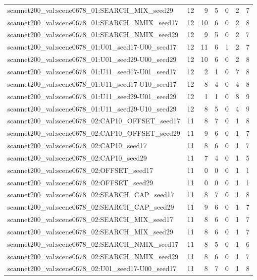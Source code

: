 \begin{table}[t]
\begin{tabular}{lrrrrrr}
scannet200\_val:scene0678\_01:SEARCH\_MIX\_seed29 & 12 & 9 & 5 & 0 & 2 & 7 \\
scannet200\_val:scene0678\_01:SEARCH\_NMIX\_seed17 & 12 & 10 & 6 & 0 & 2 & 8 \\
scannet200\_val:scene0678\_01:SEARCH\_NMIX\_seed29 & 12 & 9 & 5 & 0 & 2 & 7 \\
scannet200\_val:scene0678\_01:U01\_seed17-U00\_seed17 & 12 & 11 & 6 & 1 & 2 & 7 \\
scannet200\_val:scene0678\_01:U01\_seed29-U00\_seed29 & 12 & 10 & 6 & 0 & 2 & 8 \\
scannet200\_val:scene0678\_01:U11\_seed17-U01\_seed17 & 12 & 2 & 1 & 0 & 7 & 8 \\
scannet200\_val:scene0678\_01:U11\_seed17-U10\_seed17 & 12 & 8 & 4 & 0 & 4 & 8 \\
scannet200\_val:scene0678\_01:U11\_seed29-U01\_seed29 & 12 & 1 & 1 & 0 & 8 & 9 \\
scannet200\_val:scene0678\_01:U11\_seed29-U10\_seed29 & 12 & 8 & 5 & 0 & 4 & 9 \\
scannet200\_val:scene0678\_02:CAP10\_OFFSET\_seed17 & 11 & 8 & 7 & 0 & 1 & 8 \\
scannet200\_val:scene0678\_02:CAP10\_OFFSET\_seed29 & 11 & 9 & 6 & 0 & 1 & 7 \\
scannet200\_val:scene0678\_02:CAP10\_seed17 & 11 & 8 & 6 & 0 & 1 & 7 \\
scannet200\_val:scene0678\_02:CAP10\_seed29 & 11 & 7 & 4 & 0 & 1 & 5 \\
scannet200\_val:scene0678\_02:OFFSET\_seed17 & 11 & 0 & 0 & 0 & 1 & 1 \\
scannet200\_val:scene0678\_02:OFFSET\_seed29 & 11 & 0 & 0 & 0 & 1 & 1 \\
scannet200\_val:scene0678\_02:SEARCH\_CAP\_seed17 & 11 & 8 & 7 & 0 & 1 & 8 \\
scannet200\_val:scene0678\_02:SEARCH\_CAP\_seed29 & 11 & 9 & 6 & 0 & 1 & 7 \\
scannet200\_val:scene0678\_02:SEARCH\_MIX\_seed17 & 11 & 8 & 6 & 0 & 1 & 7 \\
scannet200\_val:scene0678\_02:SEARCH\_MIX\_seed29 & 11 & 8 & 6 & 0 & 1 & 7 \\
scannet200\_val:scene0678\_02:SEARCH\_NMIX\_seed17 & 11 & 8 & 5 & 0 & 1 & 6 \\
scannet200\_val:scene0678\_02:SEARCH\_NMIX\_seed29 & 11 & 8 & 6 & 0 & 1 & 7 \\
scannet200\_val:scene0678\_02:U01\_seed17-U00\_seed17 & 11 & 8 & 7 & 0 & 1 & 8 \\

\end{tabular}
\end{table}
